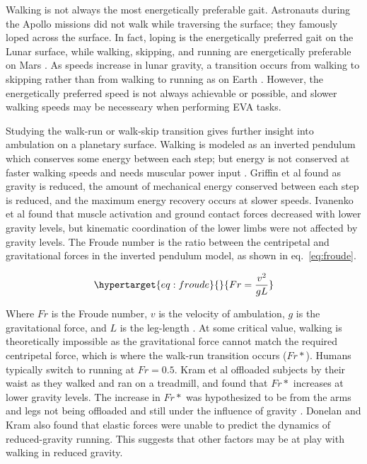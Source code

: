 \documentclass[defaultstyle,11pt]{comps}
\begin{document}
Walking is not always the most energetically preferable gait.
Astronauts during the Apollo missions did not walk while traversing the surface; they famously loped across the surface.
In fact, loping is the energetically preferred gait on the Lunar surface, while walking, skipping, and running are energetically preferable on Mars \citep{Ackermann2012b}.
As speeds increase in lunar gravity, a transition occurs from walking to skipping rather than from walking to running as on Earth \citep{Minetti2012}.
However, the energetically preferred speed is not always achievable or possible, and slower walking speeds may be necesseary when performing EVA tasks.

Studying the walk-run or walk-skip transition gives further insight into ambulation on a planetary surface.
Walking is modeled as an inverted pendulum which conserves some energy between each step; but energy is not conserved at faster walking speeds and needs muscular power input \citep{Cavagna1976, Cavagna1977}.
Griffin et al \citep{Griffin1999} found as gravity is reduced, the amount of mechanical energy conserved between each step is reduced, and the maximum energy recovery occurs at slower speeds.
Ivanenko et al \citep{Ivanenko2002} found that muscle activation and ground contact forces decreased with lower gravity levels, but kinematic coordination of the lower limbs were not affected by gravity levels.
The Froude number is the ratio between the centripetal and gravitational forces in the inverted pendulum model, as shown in eq.~\ref{eq:froude}.

\begin{equation}\protect\hypertarget{eq:froude}{}{
Fr=\frac{v^{2}}{gL}
}\label{eq:froude}\end{equation}

Where \(Fr\) is the Froude number, \(v\) is the velocity of ambulation, \(g\) is the gravitational force, and \(L\) is the leg-length \citep{AlexanderMcN.1989}.
At some critical value, walking is theoretically impossible as the gravitational force cannot match the required centripetal force, which is where the walk-run transition occurs (\(Fr*\)).
Humans typically switch to running at \(Fr=0.5\).
Kram et al \citep{Kram1997} offloaded subjects by their waist as they walked and ran on a treadmill, and found that \(Fr*\) increases at lower gravity levels.
The increase in \(Fr*\) was hypothesized to be from the arms and legs not being offloaded and still under the influence of gravity \citep{Kram1997}.
Donelan and Kram \citep{Donelan2000} also found that elastic forces were unable to predict the dynamics of reduced-gravity running.
This suggests that other factors may be at play with walking in reduced gravity.
\end{document}
